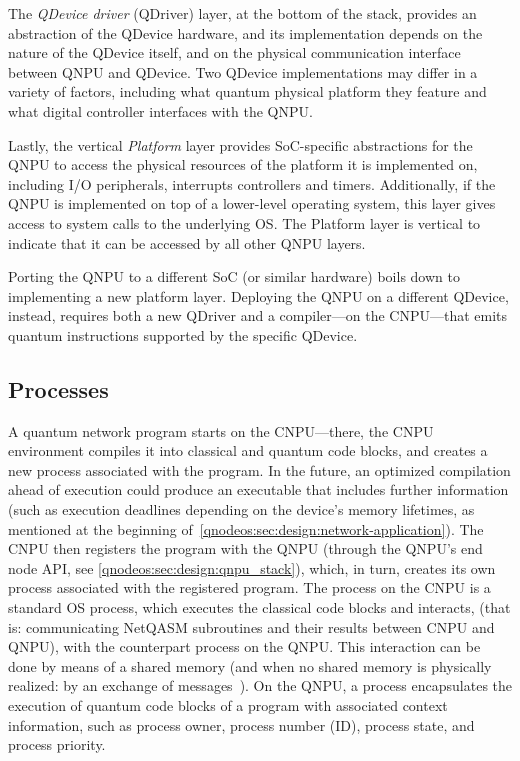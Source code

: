 The \emph{\ac{QDevice} driver} (\ac{QDriver}) layer, at the bottom of the stack, provides an abstraction of the \ac{QDevice} hardware, and its implementation depends on the nature of the \ac{QDevice} itself, and on the physical communication interface between \ac{QNPU} and \ac{QDevice}. Two \ac{QDevice} implementations may differ in a variety of factors, including what quantum physical platform they feature and what digital controller interfaces with the \ac{QNPU}.

Lastly, the vertical \emph{Platform} layer provides \ac{SoC}-specific abstractions for the \ac{QNPU} to access the physical resources of the platform it is implemented on, including I/O peripherals, interrupts controllers and timers. Additionally, if the \ac{QNPU} is implemented on top of a lower-level operating system, this layer gives access to system calls to the underlying \ac{OS}. The Platform layer is vertical to indicate that it can be accessed by all other \ac{QNPU} layers.

Porting the \ac{QNPU} to a different \ac{SoC} (or similar hardware) boils down to implementing a new platform layer. Deploying the \ac{QNPU} on a different \ac{QDevice}, instead, requires both a new \ac{QDriver} and a compiler---on the \ac{CNPU}---that emits quantum instructions supported by the specific \ac{QDevice}.

\subsection{Processes}
\label{qnodeos:sec:design:processes}

A quantum network program starts on the \ac{CNPU}---there, the \ac{CNPU} environment compiles it into classical and quantum code blocks, and creates a new process associated with the program. In the future, an optimized compilation ahead of execution could produce an executable that includes further information (such as execution deadlines depending on the device's memory lifetimes, as mentioned at the beginning of~\cref{qnodeos:sec:design:network-application}). The \ac{CNPU} then registers the program with the \ac{QNPU} (through the \ac{QNPU}'s end node \ac{API}, see \cref{qnodeos:sec:design:qnpu_stack}), which, in turn, creates its own process associated with the registered program. The process on the \ac{CNPU} is a standard \ac{OS} process, which executes the classical code blocks and interacts, (that is: communicating NetQASM subroutines and their results between \ac{CNPU} and \ac{QNPU}), with the counterpart process on the \ac{QNPU}. This interaction can be done by means of a shared memory (and when no shared memory is physically realized: by an exchange of messages~\cite{dahlberg_2022_netqasm}). On the \ac{QNPU}, a process encapsulates the execution of quantum code blocks of a program with associated context information, such as process owner, process number (ID), process state, and process priority.


